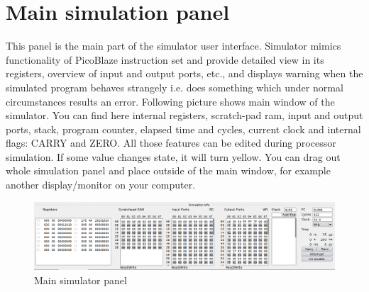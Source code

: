 \section{Main simulation panel}
    This panel is the main part of the simulator user interface. Simulator mimics functionality of PicoBlaze instruction
    set and provide detailed view in its registers, overview of input and output ports, etc., and displays warning when
    the simulated program behaves strangely i.e. does something which under normal circumstances results an error.
    Following picture shows main window of the simulator. You can find here internal registers, scratch-pad ram, input
    and output ports, stack, program counter, elapsed time and cycles, current clock and internal flags: CARRY and ZERO.
    All those features can be edited during processor simulation. If some value changes state, it will turn yellow. You
    can drag out whole simulation panel and place outside of the main window, for example another display/monitor on
    your computer.

   \begin{figure}[h!]
        \centering
        \includegraphics[width=\textwidth]{img/bottom_panel.png}
        \caption{Main simulator panel}
    \end{figure}

